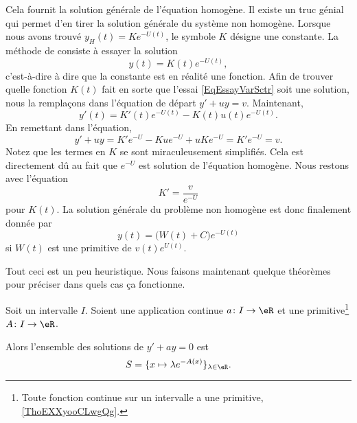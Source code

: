Cela fournit la solution générale de l'équation homogène. Il existe un truc génial qui permet d'en tirer la solution générale du système non homogène. Lorsque nous avons trouvé \( y_H(t)=K e^{-U(t)}\), le symbole \( K\) désigne une constante. La méthode de  consiste à essayer la solution
\begin{equation}		\label{EqEssayVarSctr}
	y(t)=K(t) e^{-U(t)},
\end{equation}
c'est-à-dire à dire que la constante est en réalité une fonction. Afin de trouver quelle fonction \( K(t)\) fait en sorte que l'essai \eqref{EqEssayVarSctr} soit une solution, nous la remplaçons dans l'équation de départ \( y'+uy=v\). Maintenant,
\begin{equation}
	y'(t)=K'(t) e^{-U(t)}-K(t)u(t) e^{-U(t)}.
\end{equation}
En remettant dans l'équation,
\begin{equation}
	y'+uy=K' e^{-U}-Ku e^{-U}+uK e^{-U}=K' e^{-U}=v.
\end{equation}
Notez que les termes en \( K\) se sont miraculeusement simplifiés. Cela est directement dû au fait que \(  e^{-U}\) est solution de l'équation homogène. Nous restons avec l'équation
\begin{equation}
	K'=\frac{ v }{  e^{-U} }
\end{equation}
pour \( K(t)\). La solution générale du problème non homogène est donc finalement donnée par
\begin{equation}
	y(t)=\big( W(t)+C \big) e^{-U(t)}
\end{equation}
si \( W(t)\) est une primitive de \( v(t)e^{U(t)}\).

Tout ceci est un peu heuristique. Nous faisons maintenant quelque théorèmes pour préciser dans quels cas ça fonctionne.

\begin{proposition}	\label{PROPooFECJooPiqZHR}
	Soit un intervalle \( I\). Soient une application continue \(a \colon I\to \eR  \) et une primitive\footnote{Toute fonction continue sur un intervalle a une primitive, \ref{ThoEXXyooCLwgQg}.} \(A \colon I\to \eR  \).

	Alors l'ensemble des solutions de \( y'+ay=0\) est
	\begin{equation}
		S=\{ x\mapsto \lambda e^{-A(x)} \}_{\lambda\in \eR}.
	\end{equation}
\end{proposition}

